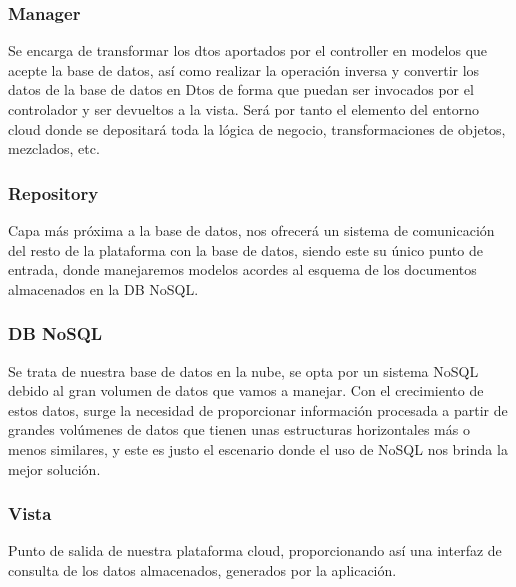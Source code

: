 \documentclass[12pt,a4paper,oneside]{book} %
\begin{document}
\subsubsection{Manager}
Se encarga de transformar los dtos aportados por el controller en modelos que acepte la base de datos, así como realizar la operación inversa y convertir los datos de la base de datos en Dtos de forma que puedan ser invocados por el controlador y ser devueltos a la vista. 
\newline
\newline
Será por tanto el elemento del entorno cloud donde se depositará toda la lógica de negocio, transformaciones de objetos, mezclados, etc. 
\subsubsection{Repository}
Capa más próxima a la base de datos, nos ofrecerá un sistema de comunicación del resto de la plataforma con la base de datos, siendo este su único punto de entrada, donde manejaremos modelos acordes al esquema de los documentos almacenados en la DB NoSQL. 
\subsubsection{DB NoSQL}
Se trata de nuestra base de datos en la nube, se opta por un sistema NoSQL debido al gran volumen de datos que vamos a manejar. Con el crecimiento de estos datos, surge la necesidad de proporcionar información procesada a partir de grandes volúmenes de datos que tienen unas estructuras horizontales más o menos similares, y este es justo el escenario donde el uso de NoSQL nos brinda la mejor solución. 
\subsubsection{Vista}
Punto de salida de nuestra plataforma cloud, proporcionando así una interfaz de consulta de los datos almacenados, generados por la aplicación. \\
\end{document}
